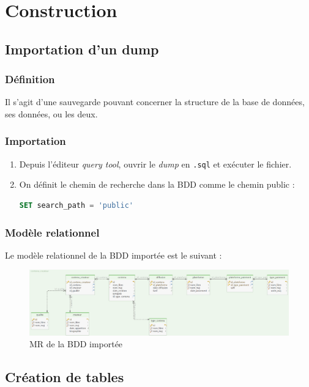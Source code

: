 \chapter{Construction}
\minitoc

\section{Importation d'un dump}
\subsection{Définition}
Il s'agit d'une sauvegarde pouvant concerner la structure de la base de données, ses données, ou les deux.

\subsection{Importation}
\begin{enumerate}
    \item Depuis l'éditeur \textit{query tool}, ouvrir le \textit{dump} en \texttt{.sql} et exécuter le fichier.
    \item On définit le chemin de recherche dans la BDD comme le chemin public :
    \begin{lstlisting}[language=SQL]
    SET search_path = 'public'
    \end{lstlisting}
\end{enumerate}

\subsection{Modèle relationnel}
Le modèle relationnel de la BDD importée est le suivant :
\begin{figure}[H]
    \centering
    \includegraphics[width=1\linewidth]{image/MR_DUmp.png}
    \caption{MR de la BDD importée}
    \label{fig:enter-label}
\end{figure}

\section{Création de tables}
